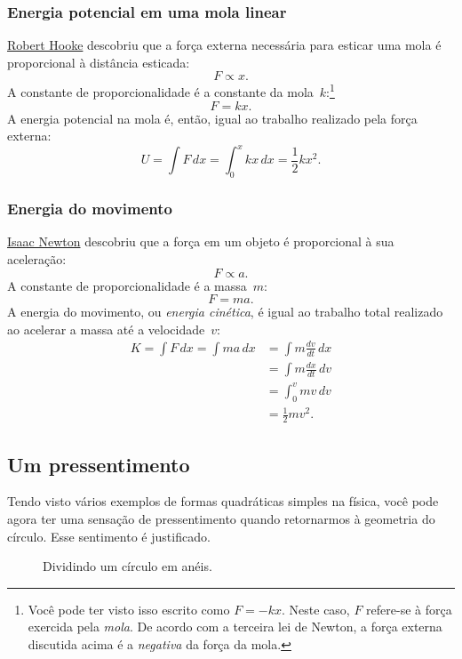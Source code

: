     \subsubsection{Energia potencial em uma mola linear} %
    \label{sec:potential_energy_in_a_linear_spring}

\href{https://pt.wikipedia.org/wiki/Robert_Hooke}{Robert Hooke} descobriu que a força externa necessária para esticar uma mola é proporcional à distância esticada:
\[ F \propto x. \]
A constante de proporcionalidade é a constante da mola~$k$:\footnote{Você pode ter visto isso escrito como $F = -kx$. Neste caso, $F$ refere-se à força exercida pela \emph{mola}. De acordo com a terceira lei de Newton, a força externa discutida acima é a \emph{negativa} da força da mola.}
\[ F = k x. \]
A energia potencial na mola é, então, igual ao trabalho realizado pela força externa:
\[ U = \int F\,dx = \int_0^x kx\,dx = \textstyle{\frac{1}{2}} kx^2. \]

    \subsubsection{Energia do movimento} %
    \label{sec:energy_of_motion}

\href{https://pt.wikipedia.org/wiki/Isaac_Newton}{Isaac Newton} descobriu que a força em um objeto é proporcional à sua aceleração:
\[ F \propto a. \]
A constante de proporcionalidade é a massa~$m$:
\[ F = m a. \]
A energia do movimento, ou \emph{energia cinética}, é igual ao trabalho total realizado ao acelerar a massa até a velocidade~$v$:
\[
\begin{split}
K = \int F\,dx = \int ma\,dx & = \int m\frac{dv}{dt}\,dx \\ & = \int m\frac{dx}{dt}\,dv \\ & = \int_0^v mv\,dv \\ & = \textstyle{\frac{1}{2}} mv^2.
\end{split}
\]

  \subsection{Um pressentimento} %
  \label{sec:a_sense_of_foreboding}

Tendo visto vários exemplos de formas quadráticas simples na física, você pode agora ter uma sensação de pressentimento quando retornarmos à geometria do círculo. Esse sentimento é justificado.

\begin{figure}
\begin{center}
\end{center}
\caption{Dividindo um círculo em anéis.\label{fig:circular_area}}
\end{figure}


